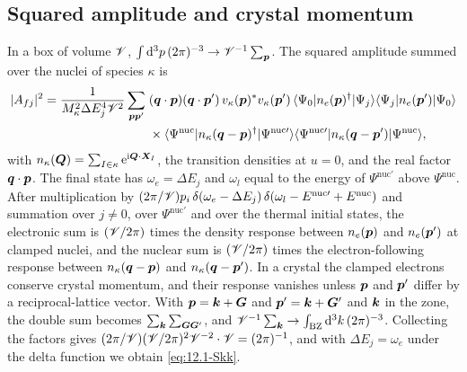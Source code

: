 \subsection{Squared amplitude and crystal momentum}\label{app:D.33-square}

In a box of volume $\mathscr{V}$, $\int\mathrm{d}^3p\,(2\pi)^{-3} \to \mathscr{V}^{-1}\sum_{\bm{p}}$. The squared amplitude summed over the nuclei of species $\kappa$ is
\begin{equation*}
  \begin{split}
  |A_{fj}|^2 = \frac{1}{M_\kappa^2\Delta E_j^4\mathscr{V}^2}\sum_{\bm{p}\bm{p}'}\;&(\bm{q}\cdot\bm{p})(\bm{q}\cdot\bm{p}')\,v_\kappa(\bm{p})^*v_\kappa(\bm{p}')\,
  \langle\Psi_0|n_e(\bm{p})^\dagger|\Psi_j\rangle\langle\Psi_j|n_e(\bm{p}')|\Psi_0\rangle \\
  &\times\langle\Psi^{\mathrm{nuc}}|n_\kappa(\bm{q}-\bm{p})^\dagger|\Psi^{\mathrm{nuc}\prime}\rangle\langle\Psi^{\mathrm{nuc}\prime}|n_\kappa(\bm{q}-\bm{p}')|\Psi^{\mathrm{nuc}}\rangle ,
  \end{split}
\end{equation*}
with $n_\kappa(\bm{Q}) = \sum_{I\in\kappa}\mathrm{e}^{\mathrm{i}\bm{Q}\cdot\bm{X}_I}$, the transition densities at $u = 0$, and the real factor $\bm{q}\cdot\bm{p}$. The final state has $\omega_e = \Delta E_j$ and $\omega_l$ equal to the energy of $\Psi^{\mathrm{nuc}\prime}$ above $\Psi^{\mathrm{nuc}}$. After multiplication by $(2\pi/\mathscr{V})p_i\,\delta(\omega_e - \Delta E_j)\,\delta(\omega_l - E^{\mathrm{nuc}\prime} + E^{\mathrm{nuc}})$ and summation over $j \neq 0$, over $\Psi^{\mathrm{nuc}\prime}$ and over the thermal initial states, the electronic sum is $(\mathscr{V}/2\pi)$ times the density response between $n_e(\bm{p})$ and $n_e(\bm{p}')$ at clamped nuclei, and the nuclear sum is $(\mathscr{V}/2\pi)$ times the electron-following response between $n_\kappa(\bm{q}-\bm{p})$ and $n_\kappa(\bm{q}-\bm{p}')$. In a crystal the clamped electrons conserve crystal momentum, and their response vanishes unless $\bm{p}$ and $\bm{p}'$ differ by a reciprocal-lattice vector. With $\bm{p} = \bm{k} + \bm{G}$ and $\bm{p}' = \bm{k} + \bm{G}'$ and $\bm{k}$ in the zone, the double sum becomes $\sum_{\bm{k}}\sum_{\bm{G}\bm{G}'}$, and $\mathscr{V}^{-1}\sum_{\bm{k}} \to \int_{\mathrm{BZ}}\mathrm{d}^3k\,(2\pi)^{-3}$. Collecting the factors gives $(2\pi/\mathscr{V})(\mathscr{V}/2\pi)^2\mathscr{V}^{-2}\cdot \mathscr{V} = (2\pi)^{-1}$, and with $\Delta E_j = \omega_e$ under the delta function we obtain \cref{eq:12.1-Skk}.

